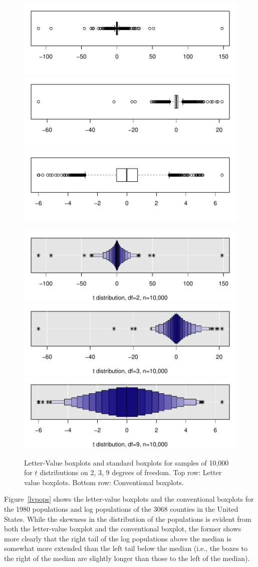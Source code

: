 \documentclass[oneside]{article}
\begin{document}
\begin{figure}[hbtp]
  \centering
  \includegraphics[width = 0.32\linewidth]{t2}
  \includegraphics[width = 0.32\linewidth]{t3}
  \includegraphics[width = 0.32\linewidth]{t9}

  \includegraphics[width = 0.32\linewidth]{t2-b}
  \includegraphics[width = 0.32\linewidth]{t3-b}
  \includegraphics[width = 0.32\linewidth]{t9-b}
  
  \caption{Letter-Value boxplots and standard boxplots for samples of 10,000
  for $t$ distributions on 2, 3, 9 degrees of freedom. Top row: Letter value
  boxplots. Bottom row: Conventional boxplots.}
  \label{t-dist}
\end{figure}

Figure~\ref{lvpops} shows the letter-value boxplots and the conventional boxplots for the 1980 populations and log populations of the 3068 counties in the United States. While the skewness in the distribution of the populations is evident from both the letter-value boxplot and the conventional boxplot, the former shows more clearly that the right tail of the log populations above the median is somewhat more extended than the left tail below the median (i.e., the boxes to the right of the median are slightly longer than those to the left of the median).
\end{document}
